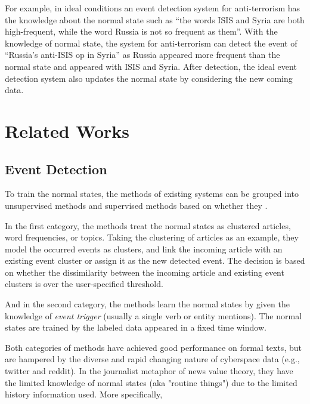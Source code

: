 \documentclass[conference,compsoc]{IEEEtran}
\begin{document}
For example, in ideal conditions an event detection system for anti-terrorism has the knowledge about the normal state such as “the words ISIS and Syria are both high-frequent, while the word Russia is not so frequent as them”. 
With the knowledge of normal state, the system for anti-terrorism can detect the event of “Russia's anti-ISIS op in Syria” as Russia appeared more frequent than the normal state and appeared with ISIS and Syria. 
After detection, the ideal event detection system also updates the normal state by considering the new coming data.



\section{Related Works}
\subsection{Event Detection}

To train the normal states, the methods of existing systems can be grouped into unsupervised methods and supervised methods based on whether they .

In the first category, the methods treat the normal states as clustered articles\cite{Petrovic:2010uj}\cite{Wurzer:2015wq}, word frequencies\cite{Mathioudakis:2010fc}\cite{Weng:2011wz}, or topics\cite{Diao:2012wj}\cite{Yan:2015wm}. 
Taking the clustering of articles\cite{Petrovic:2010uj}\cite{Wurzer:2015wq} as an example, they model the occurred events as clusters, and link the incoming article with an existing event cluster or assign it as the new detected event.
The decision is based on whether the dissimilarity between the incoming article and existing event clusters is over the user-specified threshold. 

And in the second category, the methods learn the normal states by given the knowledge of \textit{event trigger}\cite{Li2013JointEE}\cite{Nguyen2015EventDA} (usually a single verb or entity mentions). The normal states are trained by the labeled data appeared in a fixed time window.

Both categories of methods have achieved good performance on formal texts, but are hampered by the diverse and rapid changing nature of cyberspace data (e.g., twitter\cite{Asur:2011tc} and reddit\cite{singer2014evolution}).
In the journalist metaphor of news value theory, they have the limited knowledge of normal states (aka "routine things") due to the limited history information used. 
More specifically, 
\end{document}
